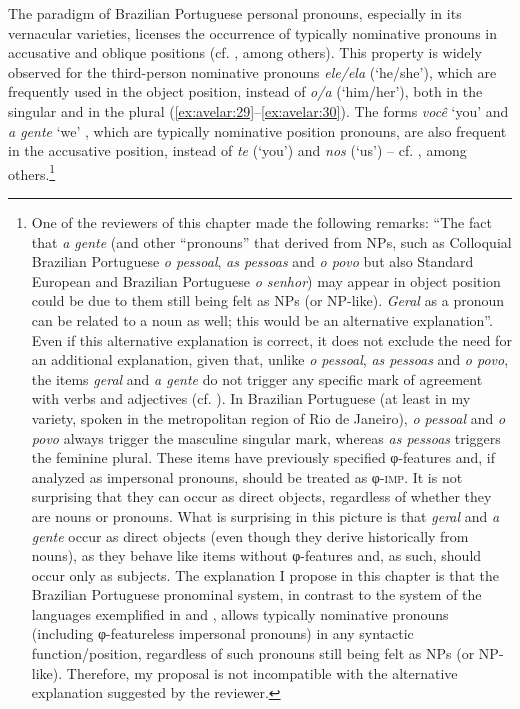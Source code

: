 \documentclass[output=paper]{langscibook}
\begin{document}
{The paradigm of Brazilian Portuguese personal pronouns, especially in its vernacular varieties, licenses the occurrence of typically nominative pronouns in accusative and oblique positions (cf. \citealt{Carvalho2008, GalvesEtAl2016}, among others). This property is widely observed for the third-person nominative pronouns} {\textit{ele/ela}} {(‘he/she’), which are frequently used in the object position, instead of} {\textit{o/a} }{(‘him/her’), both in the singular and in the plural (\ref{ex:avelar:29}--\ref{ex:avelar:30}). The forms} {\textit{você} }{‘you’  and} {\textit{a gente} }{‘we’ , which are typically nominative position pronouns, are also frequent in the accusative position, instead of} {\textit{te} }{(‘you’) and} {\textit{nos} }{(‘us’) – cf. \citealt{Lopes2003, ViannaLopes2012, LopesVianna2013, LopesRumeu2015}, among others.}\footnote{One of the reviewers of this chapter made the following remarks: “The fact that {\textit{a gente} }{(and other ``pronouns'' that derived from NPs, such as Colloquial Brazilian Portuguese} {\textit{o pessoal}}, {\textit{as pessoas}} {and} {\textit{o povo} }{but also Standard European and Brazilian Portuguese}{ \textit{o senhor}}{) may appear in object position could be due to them still being felt as NPs (or NP-like).} {\textit{Geral}} {as a pronoun can be related to a noun as well; this would be an alternative explanation”. Even if this alternative explanation is correct, it does not exclude the need for an additional explanation, given that, unlike} {\textit{o pessoal}}, {\textit{as pessoas}} and {\textit{o povo}}{, the items} {\textit{geral}} {and} {\textit{a gente}} {do not trigger any specific mark of agreement with verbs and adjectives (cf. ). In Brazilian Portuguese (at least in my variety, spoken in the metropolitan region of Rio de Janeiro),} {\textit{o pessoal}} {and} {\textit{o povo} }{always trigger the masculine singular mark, whereas} {\textit{as pessoas}} {triggers the feminine plural. These items have previously specified φ-features and, if analyzed as impersonal pronouns, should be treated as φ-\textsc{imp}. It is not surprising that they can occur as direct objects, regardless of whether they are nouns or pronouns. What is surprising in this picture is that} {\textit{geral}} {and} {\textit{a gente}} {occur as direct objects (even though they derive historically from nouns), as they behave like items without φ-features and, as such, should occur only as subjects. The explanation I propose in this chapter is that the Brazilian Portuguese pronominal system, in contrast to the system of the languages exemplified in \citet{Egerland2003} and \citet{Fenger2018}, allows typically nominative pronouns (including φ-featureless impersonal pronouns) in any syntactic function/position, regardless of such pronouns still being felt as NPs (or NP-like). Therefore, my proposal is not incompatible with the alternative explanation suggested by the reviewer.}}
\end{document}
